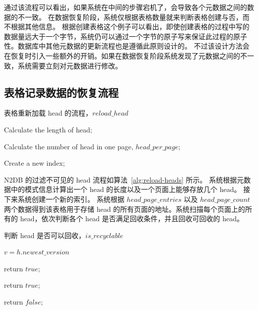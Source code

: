 通过该流程可以看出，如果系统在中间的步骤宕机了，会导致各个元数据之间的数据的不一致。
在数据恢复阶段，系统仅根据表格数量就来判断表格创建与否，而不根据其他信息。
根据创建表格这个例子可以看出，即使创建表格的过程中写的数据量远大于一个字节，系统仍可以通过一个字节的原子写来保证此过程的原子性。数据库中其他元数据的更新流程也是遵循此原则设计的。
不过该设计方法会在恢复时引入一些额外的开销。如果在数据恢复阶段系统发现了元数据之间的不一致，系统需要立刻对元数据进行修改。


\subsection{表格记录数据的恢复流程}
\label{ssec:record-data-recovery}

\begin{algorithm}[ht]
    \caption{表格重新加载 head 的流程，$reload\_head$}
    \label{alg:reload-heads}
    \BlankLine

    Calculate the length of head;

    Calculate the number of head in one page, $head\_per\_page$;

    Create a new index;

    {
    }
\end{algorithm}



N2DB 的过滤不可见的 head 流程如算法~\ref{alg:reload-heads} 所示。
系统根据元数据中的模式信息计算出一个 head 的长度以及一个页面上能够存放几个 head。
接下来系统创建一个新的索引。
系统根据 $head\_page\_entries$ 以及 $ head\_page\_count$ 两个数据得到该表格用于存储 head 的所有页面的地址。系统扫描每个页面上的所有的 head，依次判断各个 head 是否满足回收条件，并且回收可回收的 head。

\begin{algorithm}[ht]
    \caption{判断 head 是否可以回收，$is\_recyclable$}
    \label{alg:head-visibility}
    \BlankLine

    $v = h.newest\_version$



     {
        return $true$;
    }

     {
        return $true$;
    }

    return $false$;


\end{algorithm}

